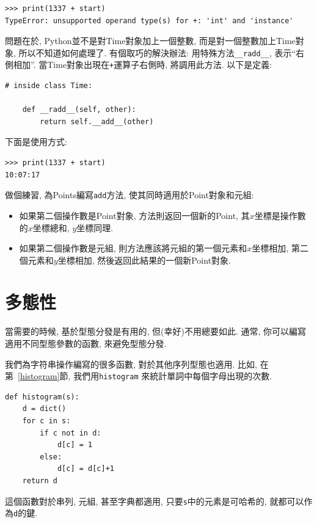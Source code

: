 \documentclass[10pt]{book}
\begin{document}
\begin{verbatim}
>>> print(1337 + start)
TypeError: unsupported operand type(s) for +: 'int' and 'instance'
\end{verbatim}
%
問題在於, Python並不是對Time對象加上一個整數, 
而是對一個整數加上Time對象, 
所以不知道如何處理了. 
有個取巧的解決辦法: 用特殊方法\verb"__radd__", 表示``右側相加''. 
當Time對象出現在{\tt +}運算子右側時, 將調用此方法. 
以下是定義:

\begin{verbatim}
# inside class Time:

    def __radd__(self, other):
        return self.__add__(other)
\end{verbatim}
%
下面是使用方式:

\begin{verbatim}
>>> print(1337 + start)
10:07:17
\end{verbatim}
%

做個練習, 為Points編寫{\tt add}方法, 使其同時適用於Point對象和元組:

\begin{itemize}

\item 如果第二個操作數是Point對象, 方法則返回一個新的Point, 
其$x$坐標是操作數的$x$坐標總和, $y$坐標同理. 

\item 如果第二個操作數是元組, 則方法應該將元組的第一個元素和$x$坐標相加, 
第二個元素和$y$坐標相加, 然後返回此結果的一個新Point對象. 

\end{itemize}


\section{多態性}
\label{polymorphism}

當需要的時候, 基於型態分發是有用的, 但(幸好)不用總要如此. 
通常, 你可以編寫適用不同型態參數的函數, 來避免型態分發. 

我們為字符串操作編寫的很多函數, 對於其他序列型態也適用. 
比如, 在第~\ref{histogram}節, 我們用{\tt histogram} 來統計單詞中每個字母出現的次數. 

\begin{verbatim}
def histogram(s):
    d = dict()
    for c in s:
        if c not in d:
            d[c] = 1
        else:
            d[c] = d[c]+1
    return d
\end{verbatim}
%
這個函數對於串列, 元組, 甚至字典都適用, 只要{\tt s}中的元素是可哈希的, 
就都可以作為{\tt d}的鍵. 
\end{document}
